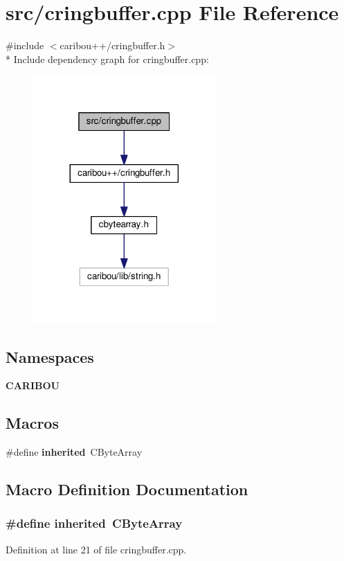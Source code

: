 \section{src/cringbuffer.cpp File Reference}
\label{cringbuffer_8cpp}
{\ttfamily \#include $<$caribou++/cringbuffer.\+h$>$}\\*
Include dependency graph for cringbuffer.\+cpp\+:
\nopagebreak
\begin{figure}[H]
\begin{center}
\leavevmode
\includegraphics[width=197pt]{cringbuffer_8cpp__incl}
\end{center}
\end{figure}
\subsection*{Namespaces}
\begin{DoxyCompactItemize}
\item 
 {\bf C\+A\+R\+I\+B\+OU}
\end{DoxyCompactItemize}
\subsection*{Macros}
\begin{DoxyCompactItemize}
\item 
\#define {\bf inherited}~C\+Byte\+Array
\end{DoxyCompactItemize}


\subsection{Macro Definition Documentation}
\subsubsection[{inherited}]{\setlength{\rightskip}{0pt plus 5cm}\#define inherited~C\+Byte\+Array}\label{cringbuffer_8cpp_a3920e3b7cb0909b941b2409493acf8f1}


Definition at line 21 of file cringbuffer.\+cpp.

